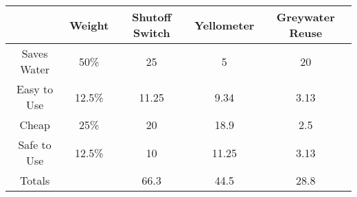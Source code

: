 \documentclass[11pt,letterpaper]{report}
\begin{document}
\vspace{1cm}

\begin{tabular}{ | c | c | c | c | c |}
\hline
 & Weight & Shutoff Switch & Yellometer & Greywater Reuse \\
\hline
Saves Water & 50\% & 25 & 5 & 20 \\
Easy to Use & 12.5\% & 11.25 & 9.34 & 3.13 \\ 
Cheap & 25\% & 20 & 18.9 & 2.5 \\
Safe to Use & 12.5\% & 10 & 11.25 & 3.13 \\
\hline
Totals & & 66.3 & 44.5 & 28.8 \\
\hline
\end{tabular}
\end{document}
